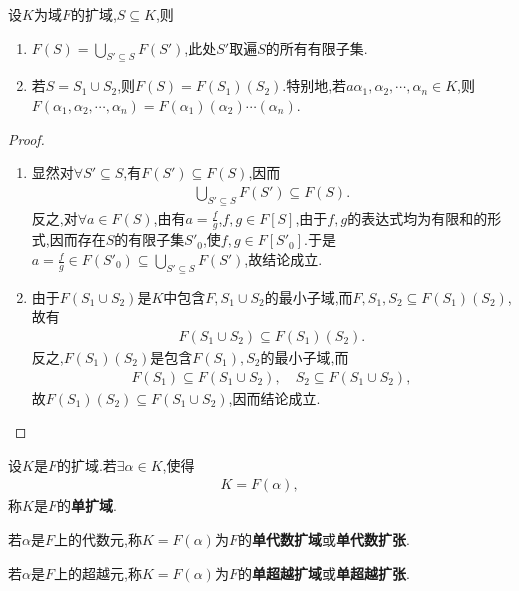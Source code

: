 \documentclass[../../main.tex]{subfiles}%
\begin{document}
\begin{theorem}
设$K$为域$F$的扩域,$S\subseteq K$,则
\begin{enumerate}[(1)]
\item $F(S)=\bigcup\limits_{S'\subseteq S}F(S')$,此处$S'$取遍$S$的所有有限子集.

\item 若$S=S_1\cup S_2$,则$F(S)=F(S_1)(S_2)$.特别地,若$a\alpha_1,\alpha_2,\cdots,\alpha_n\in K$,则$F(\alpha_1,\alpha_2,\cdots,\alpha_n)=F(\alpha_1)(\alpha_2)\cdots(\alpha_n)$.
\end{enumerate}
\end{theorem}

\begin{proof}
\begin{enumerate}[(1)]
\item 显然对$\forall S'\subseteq S$,有$F(S')\subseteq F(S)$,因而
\begin{align*}
\bigcup\limits_{S'\subseteq S}F(S')\subseteq F(S).
\end{align*}
反之,对$\forall a\in F(S)$,由有$a=\frac{f}{g}$,$f,g\in F[S]$,由于$f,g$的表达式均为有限和的形式,因而存在$S$的有限子集$S'_0$,使$f,g\in F[S'_0]$.于是$a=\frac{f}{g}\in F(S'_0)\subseteq\bigcup\limits_{S'\subseteq S}F(S')$,故结论成立.

\item 由于$F(S_1\cup S_2)$是$K$中包含$F,S_1\cup S_2$的最小子域,而$F,S_1,S_2\subseteq F(S_1)(S_2)$,故有
\begin{align*}
F(S_1\cup S_2)\subseteq F(S_1)(S_2).
\end{align*}
反之,$F(S_1)(S_2)$是包含$F(S_1),S_2$的最小子域,而
\begin{align*}
F(S_1)\subseteq F(S_1\cup S_2),\quad S_2\subseteq F(S_1\cup S_2),
\end{align*}
故$F(S_1)(S_2)\subseteq F(S_1\cup S_2)$,因而结论成立.
\end{enumerate}
\end{proof}

\begin{definition}
设$K$是$F$的扩域.若$\exists\alpha\in K$,使得
\begin{align*}
K=F(\alpha),
\end{align*}
称$K$是$F$的\textbf{单扩域}.

若$\alpha$是$F$上的代数元,称$K=F(\alpha)$为$F$的\textbf{单代数扩域}或\textbf{单代数扩张}.

若$\alpha$是$F$上的超越元,称$K=F(\alpha)$为$F$的\textbf{单超越扩域}或\textbf{单超越扩张}.
\end{definition}
\end{document}
